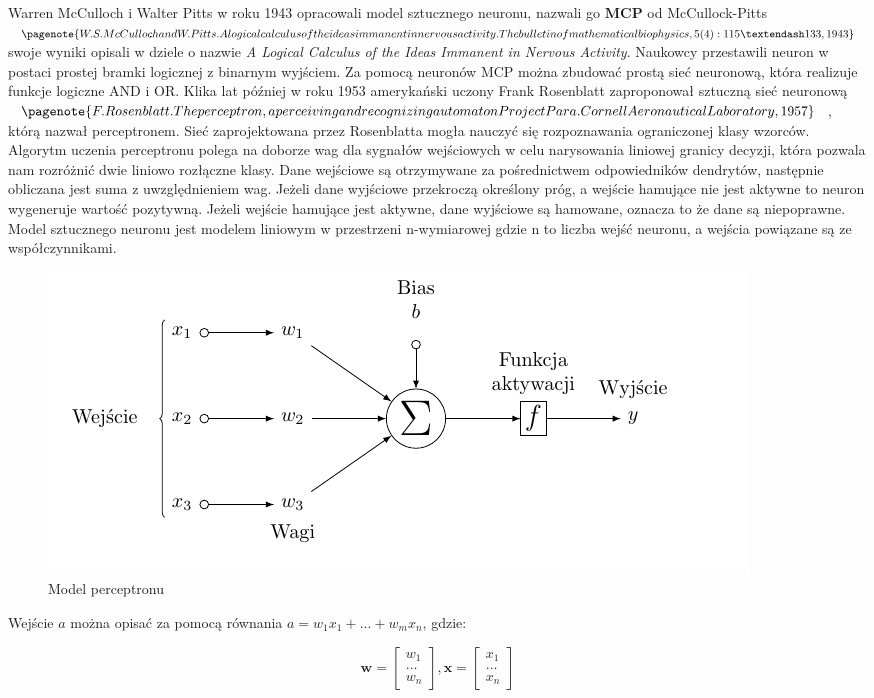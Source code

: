 Warren McCulloch i Walter Pitts w roku 1943 opracowali model sztucznego neuronu, nazwali go $\textbf{MCP}$ od McCullock-Pitts$\pagenote{W. S. McCulloch and W. Pitts. A logical calculus of the ideas immanent in nervous activity. The bulletin of mathematical biophysics, 5(4):115–133, 1943}$ swoje wyniki opisali w dziele o nazwie \textit{A Logical Calculus of the Ideas Immanent in Nervous Activity}. Naukowcy przestawili neuron w postaci prostej bramki logicznej z binarnym wyjściem. Za pomocą neuronów MCP można zbudować prostą sieć neuronową, która realizuje funkcje logiczne AND i OR. Klika lat później w roku 1953 amerykański uczony Frank Rosenblatt zaproponował sztuczną sieć neuronową$\pagenote{F. Rosenblatt. The perceptron, a perceiving and recognizing automaton Project Para. Cornell Aeronautical Laboratory, 1957}$, którą nazwał perceptronem. Sieć zaprojektowana przez Rosenblatta mogła nauczyć się rozpoznawania ograniczonej klasy wzorców. Algorytm uczenia perceptronu polega na doborze wag dla sygnałów wejściowych w celu narysowania liniowej granicy decyzji, która pozwala nam rozróżnić dwie liniowo rozłączne klasy. Dane wejściowe są otrzymywane za pośrednictwem odpowiedników dendrytów, następnie obliczana jest suma z uwzględnieniem wag. Jeżeli dane wyjściowe przekroczą określony próg, a wejście hamujące nie jest aktywne to neuron wygeneruje wartość pozytywną. Jeżeli wejście hamujące jest aktywne, dane wyjściowe są hamowane, oznacza to że dane są niepoprawne. Model sztucznego neuronu jest modelem liniowym w przestrzeni n-wymiarowej gdzie n to liczba wejść neuronu, a wejścia powiązane są ze współczynnikami. 

\begin{figure}[H]
	\centering
	\includegraphics[width=0.5\linewidth]{perceptron_latex}
	\caption{Model perceptronu}
	\label{fig:neuron}
\end{figure}

Wejście $a$ można opisać za pomocą równania $a = w_{1}x_{1} + ... + w_{m}x_{n}$, gdzie:

\[
\textbf{w} = 
\begin{bmatrix}
w_{1} \\ \dots \\ w_{n}
\end{bmatrix},
 \textbf{x} =
\begin{bmatrix}
x_{1} \\  \dots \\ x_{n}
\end{bmatrix}
\]

